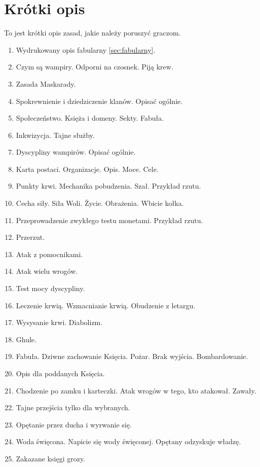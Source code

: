 \section{Krótki opis}
	To jest krótki opis zasad, jakie należy poruszyć graczom.
	\begin{enumerate}
		\item Wydrukowany opis fabularny \ref{sec:fabularny}.
		\item Czym są wampiry. Odporni na czosnek. Piją krew.
		\item Zasada Maskarady.
		\item Spokrewnienie i dziedziczenie klanów. Opisać ogólnie.
		\item Społeczeństwo. Księża i domeny. Sekty. Fabuła.
		\item Inkwizycja. Tajne służby.
		\item Dyscypliny wampirów. Opisać ogólnie.
		\item Karta postaci. Organizacje. Opis. Moce. Cele.
		\item Punkty krwi. Mechanika pobudzenia. Szał. Przykład rzutu.
		\item Cecha siły. Siła Woli. Życie. Obrażenia. Wbicie kołka.
		\item Przeprowadzenie zwykłego testu monetami. Przykład rzutu.
		\item Przerzut.
		\item Atak z pomocnikami.
		\item Atak wielu wrogów.
		\item Test mocy dyscypliny.
		\item Leczenie krwią. Wzmacnianie krwią. Obudzenie z letargu.
		\item Wysysanie krwi. Diabolizm.
		\item Ghule.
		\item Fabuła. Dziwne zachowanie Księcia. Pożar. Brak wyjścia. Bombardowanie.
		\item Opis dla poddanych Księcia.
		\item Chodzenie po zamku i karteczki. Atak wrogów w tego, kto atakował. Zawały.
		\item Tajne przejścia tylko dla wybranych.
		\item Opętanie przez ducha i wyrwanie się.
		\item Woda święcona. Napicie się wody święconej. Opętany odzyskuje władzę.
		\item Zakazane księgi grozy.
	\end{enumerate}

		
